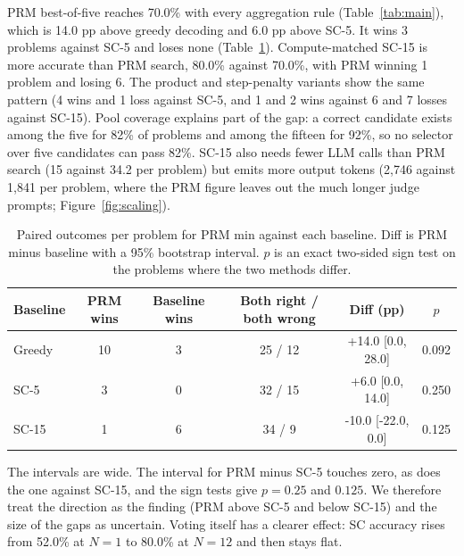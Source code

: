 \documentclass{article}
\begin{document}
PRM best-of-five reaches 70.0\% with every aggregation rule (Table~\ref{tab:main}), which is 14.0 pp above greedy decoding and 6.0 pp above SC-5. It wins 3 problems against SC-5 and loses none (Table~\ref{tab:paired}). Compute-matched SC-15 is more accurate than PRM search, 80.0\% against 70.0\%, with PRM winning 1 problem and losing 6. The product and step-penalty variants show the same pattern (4 wins and 1 loss against SC-5, and 1 and 2 wins against 6 and 7 losses against SC-15). Pool coverage explains part of the gap: a correct candidate exists among the five for 82\% of problems and among the fifteen for 92\%, so no selector over five candidates can pass 82\%. SC-15 also needs fewer LLM calls than PRM search (15 against 34.2 per problem) but emits more output tokens (2,746 against 1,841 per problem, where the PRM figure leaves out the much longer judge prompts; Figure~\ref{fig:scaling}).

\begin{table}[t]
\centering
\caption{Paired outcomes per problem for PRM min against each baseline. Diff is PRM minus baseline with a 95\% bootstrap interval. $p$ is an exact two-sided sign test on the problems where the two methods differ.}
\label{tab:paired}
\footnotesize
\begin{tabular}{lccccc}
\toprule
Baseline & PRM wins & Baseline wins & Both right / both wrong & Diff (pp) & $p$ \\
\midrule
Greedy & 10 & 3 & 25 / 12 & +14.0 [0.0, 28.0] & 0.092 \\
SC-5 & 3 & 0 & 32 / 15 & +6.0 [0.0, 14.0] & 0.250 \\
SC-15 & 1 & 6 & 34 / 9 & -10.0 [-22.0, 0.0] & 0.125 \\
\bottomrule
\end{tabular}
\end{table}

The intervals are wide. The interval for PRM minus SC-5 touches zero, as does the one against SC-15, and the sign tests give $p=0.25$ and $0.125$. We therefore treat the direction as the finding (PRM above SC-5 and below SC-15) and the size of the gaps as uncertain. Voting itself has a clearer effect: SC accuracy rises from 52.0\% at $N=1$ to 80.0\% at $N=12$ and then stays flat.
\end{document}
